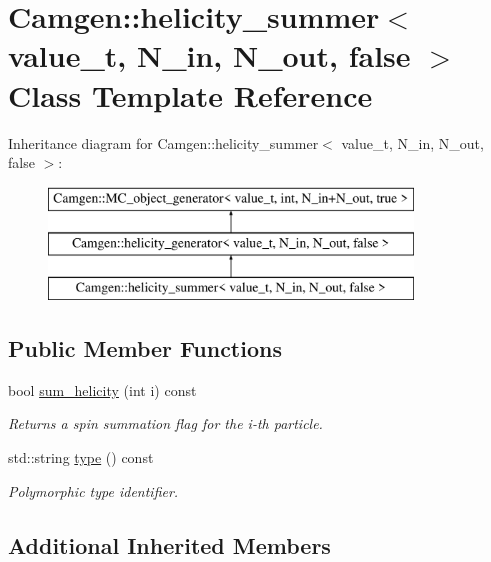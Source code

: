 \hypertarget{a00276}{\section{Camgen\-:\-:helicity\-\_\-summer$<$ value\-\_\-t, N\-\_\-in, N\-\_\-out, false $>$ Class Template Reference}
\label{a00276}
}
Inheritance diagram for Camgen\-:\-:helicity\-\_\-summer$<$ value\-\_\-t, N\-\_\-in, N\-\_\-out, false $>$\-:\begin{figure}[H]
\begin{center}
\leavevmode
\includegraphics[height=3.000000cm]{a00276}
\end{center}
\end{figure}
\subsection*{Public Member Functions}
\begin{DoxyCompactItemize}
\item 
bool \hyperlink{a00276_a919700d1b7e3d0fb241ec68ce89c234f}{sum\-\_\-helicity} (int i) const 
\begin{DoxyCompactList}\small\item\em Returns a spin summation flag for the i-\/th particle. \end{DoxyCompactList}\item 
\hypertarget{a00276_aa969143fe1fa7ff42b382bb2803f711f}{std\-::string \hyperlink{a00276_aa969143fe1fa7ff42b382bb2803f711f}{type} () const }\label{a00276_aa969143fe1fa7ff42b382bb2803f711f}

\begin{DoxyCompactList}\small\item\em Polymorphic type identifier. \end{DoxyCompactList}\end{DoxyCompactItemize}
\subsection*{Additional Inherited Members}


